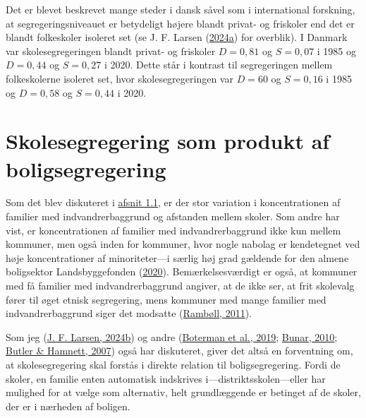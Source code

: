 \documentclass[
]{book}
\begin{document}
Det er blevet beskrevet mange steder i dansk såvel som i international forskning, at segregeringsniveauet er betydeligt højere blandt privat- og friskoler end det er blandt folkeskoler isoleret set (se J. F. Larsen (\protect\hyperlink{ref-larsen2024a}{2024a}) for overblik). I Danmark var skolesegregeringen blandt privat- og friskoler \(D=0,81\) og \(S=0,07\) i 1985 og \(D=0,44\) og \(S=0,27\) i 2020. Dette står i kontrast til segregeringen mellem folkeskolerne isoleret set, hvor skolesegregeringen var \(D=60\) og \(S=0,16\) i 1985 og \(D=0,58\) og \(S=0,44\) i 2020.

\hypertarget{skolesegregering-som-produkt-af-boligsegregering}{%
\section{Skolesegregering som produkt af boligsegregering}\label{skolesegregering-som-produkt-af-boligsegregering}}

Som det blev diskuteret i \protect\hyperlink{det-danske-skolelandskab}{afsnit 1.1}, er der stor variation i koncentrationen af familier med indvandrerbaggrund og afstanden mellem skoler. Som andre har vist, er koncentrationen af familier med indvandrerbaggrund ikke kun mellem kommuner, men også inden for kommuner, hvor nogle nabolag er kendetegnet ved høje koncentrationer af minoriteter---i særlig høj grad gældende for den almene boligsektor Landsbyggefonden (\protect\hyperlink{ref-landsbyggefonden2020}{2020}). Bemærkelsesværdigt er også, at kommuner med få familier med indvandrerbaggrund angiver, at de ikke ser, at frit skolevalg fører til øget etnisk segregering, mens kommuner med mange familier med indvandrerbaggrund siger det modsatte (\protect\hyperlink{ref-rambuxf8ll2011}{Rambøll, 2011}).

Som jeg (\protect\hyperlink{ref-larsen2024c}{J. F. Larsen, 2024b}) og andre (\protect\hyperlink{ref-boterman2019}{Boterman et al., 2019}; \protect\hyperlink{ref-bunar2010}{Bunar, 2010}; \protect\hyperlink{ref-butler2007}{Butler \& Hamnett, 2007}) også har diskuteret, giver det altså en forventning om, at skolesegregering skal forstås i direkte relation til boligsegregering. Fordi de skoler, en familie enten automatisk indskrives i---distriktsskolen---eller har mulighed for at vælge som alternativ, helt grundlæggende er betinget af de skoler, der er i nærheden af boligen.
\end{document}
